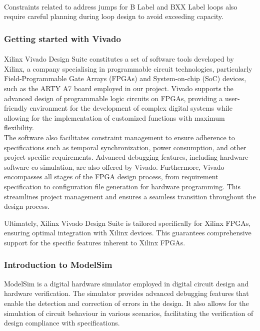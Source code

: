 \documentclass{article}
\begin{document}
\paragraph{}Constraints related to address jumps for B Label and BXX Label loops also require careful planning during loop design to avoid exceeding capacity.


\subsubsection{Getting started with Vivado}

\paragraph{}Xilinx Vivado Design Suite constitutes a set of software tools developed by Xilinx, a company specialising in programmable circuit technologies, particularly Field-Programmable Gate Arrays (FPGAs) and System-on-chip (SoC) devices, such as the ARTY A7 board employed in our project. Vivado supports the advanced design of programmable logic circuits on FPGAs, providing a user-friendly environment for the development of complex digital systems while allowing for the implementation of customized functions with maximum flexibility. \\

The software also facilitates constraint management to ensure adherence to specifications such as temporal synchronization, power consumption, and other project-specific requirements. Advanced debugging features, including hardware-software co-simulation, are also offered by Vivado. Furthermore, Vivado encompasses all stages of the FPGA design process, from requirement specification to configuration file generation for hardware programming. This streamlines project management and ensures a seamless transition throughout the design process.

Ultimately, Xilinx Vivado Design Suite is tailored specifically for Xilinx FPGAs, ensuring optimal integration with Xilinx devices. This guarantees comprehensive support for the specific features inherent to Xilinx FPGAs.

\subsubsection{Introduction to ModelSim}

ModelSim is a digital hardware simulator employed in digital circuit design and hardware verification. The simulator provides advanced debugging features that enable the detection and correction of errors in the design. It also allows for the simulation of circuit behaviour in various scenarios, facilitating the verification of design compliance with specifications. 
\end{document}
